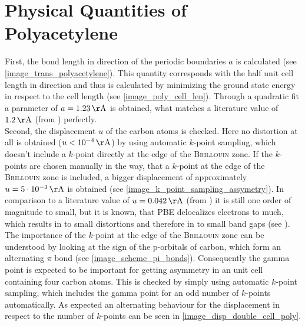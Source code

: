 \section{Physical Quantities of Polyacetylene}
First, the bond length in direction of the periodic boundaries $a$ is calculated (see \cref{image_trans_polyacetylene}). This quantity corresponds with the half unit cell length in direction and thus is calculated by minimizing the ground state energy in respect to the cell length (see \cref{image_poly_cell_len}). Through a quadratic fit a parameter of $a = \unit[1.23]{\AA}$ is obtained, what matches a literature value of $\unit[1.2]{\AA}$ (from \cite{PhysRevLett.42.1698}) perfectly.\\
Second, the displacement $u$ of the carbon atoms is checked. Here no distortion at all is obtained ($u < \unit[10^{-4}]{\AA}$) by using automatic $k$-point sampling, which doesn't include a $k$-point directly at the edge of the \textsc{Brillouin} zone. If the $k$-points are chosen manually in the way, that a $k$-point at the edge of the \textsc{Brillouin} zone is included, a bigger displacement of approximately $u = \unit[5\cdot10^{-3}]{\AA}$ is obtained (see \cref{image_k_point_sampling_assymetry}). In comparison to a literature value of $u = \unit[0.042]{\AA}$ (from \cite{PhysRevLett.42.1698, doi:10.1021/cr990357p}) it is still one order of magnitude to small, but it is known, that PBE delocalizes electrons to much, which results in to small distortions and therefore in to small band gaps (see \cite{JIANG2009120,PhysRevB.84}).\\
The importance of the $k$-point at the edge of the \textsc{Brillouin} zone can be understood by looking at the sign of the p-orbitals of carbon, which form an alternating $\pi$ bond (see \cref{image_scheme_pi_bonds}). Consequently the gamma point is expected to be important for getting asymmetry in an unit cell containing four carbon atoms. This is checked by simply using automatic $k$-point sampling, which includes the gamma point for an odd number of $k$-points automatically. As expected an alternating behaviour for the displacement in respect to the number of $k$-points can be seen in \cref{image_disp_double_cell_poly}.\\


